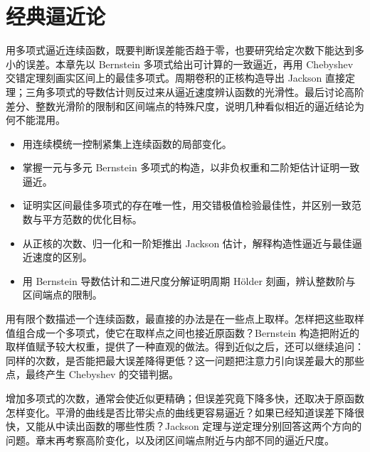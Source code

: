 \chapter{经典逼近论}
\label{b2:ch:approximation}

\begin{chapterabstract}
用多项式逼近连续函数，既要判断误差能否趋于零，也要研究给定次数下能达到多小的误差。本章先以 Bernstein 多项式给出可计算的一致逼近，再用 Chebyshev 交错定理刻画实区间上的最佳多项式。周期卷积的正核构造导出 Jackson 直接定理；三角多项式的导数估计则反过来从逼近速度辨认函数的光滑性。最后讨论高阶差分、整数光滑阶的限制和区间端点的特殊尺度，说明几种看似相近的逼近结论为何不能混用。
\end{chapterabstract}

\begin{learninggoals}
\begin{itemize}
\item\label{b2:item:approximation-goal-modulus}用连续模统一控制紧集上连续函数的局部变化。
\item\label{b2:item:approximation-goal-bernstein}掌握一元与多元 Bernstein 多项式的构造，以非负权重和二阶矩估计证明一致逼近。
\item\label{b2:item:approximation-goal-planned}证明实区间最佳多项式的存在唯一性，用交错极值检验最佳性，并区别一致范数与平方范数的优化目标。
\item\label{b2:item:approximation-goal-jackson}从正核的次数、归一化和一阶矩推出 Jackson 估计，解释构造性逼近与最佳逼近速度的区别。
\item\label{b2:item:approximation-goal-inverse}用 Bernstein 导数估计和二进尺度分解证明周期 Hölder 刻画，辨认整数阶与区间端点的限制。
\end{itemize}
\end{learninggoals}

用有限个数描述一个连续函数，最直接的办法是在一些点上取样。怎样把这些取样值组合成一个多项式，使它在取样点之间也接近原函数？Bernstein 构造把附近的取样值赋予较大权重，提供了一种直观的做法。得到近似之后，还可以继续追问：同样的次数，是否能把最大误差降得更低？这一问题把注意力引向误差最大的那些点，最终产生 Chebyshev 的交错判据。

\ProseParagraphBreak

增加多项式的次数，通常会使近似更精确；但误差究竟下降多快，还取决于原函数怎样变化。平滑的曲线是否比带尖点的曲线更容易逼近？如果已经知道误差下降很快，又能从中读出函数的哪些性质？Jackson 定理与逆定理分别回答这两个方向的问题。章末再考察高阶变化，以及闭区间端点附近与内部不同的逼近尺度。

